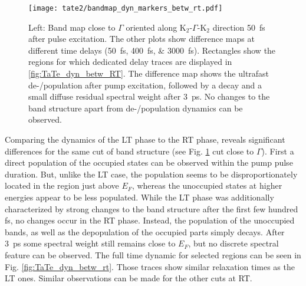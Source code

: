 \begin{figure}[t!]
	\centering
	\texttt{[image: tate2/bandmap\_dyn\_markers\_betw\_rt.pdf]}
	\caption{Left: Band map close to $\Gamma$ oriented along K$_2$-$\Gamma$-K$_2$ direction \qty{50}{\femto\second} after pulse excitation. The other plots show difference maps at different time delays (\qtylist{50;400;3000}{\femto\second}). Rectangles show the regions for which dedicated delay traces are displayed in \ref{fig:TaTe_dyn_betw_RT}. The difference map shows the ultrafast de-/population after pump excitation, followed by a decay and a small diffuse residual spectral weight after \qty{3}{\pico\second}. No changes to the band structure apart from de-/population dynamics can be observed.}
	\label{fig:TaTe_bandmap_dyn_betw_rt}
\end{figure}

Comparing the dynamics of the LT phase to the RT phase, reveals significant differences for the same cut of band structure (see Fig. \ref{fig:TaTe_bandmap_dyn_betw_rt} cut close to $\Gamma$).
First a direct population of the occupied states can be observed within the pump pulse duration.
But, unlike the LT case, the population seems to be disproportionately located in the region just above $E_F$, whereas the unoccupied states at higher energies appear to be less populated.
While the LT phase was additionally characterized by strong changes to the band structure after the first few hundred \unit{\femto\second}, no changes occur in the RT phase.
Instead, the population of the unoccupied bands, as well as the depopulation of the occupied parts simply decays.
After \qty{3}{\pico\second} some spectral weight still remains close to $E_F$, but no discrete spectral feature can be observed.
The full time dynamic for selected regions can be seen in Fig. \ref{fig:TaTe_dyn_betw_rt}.
Those traces show similar relaxation times as the LT ones.
Similar observations can be made for the other cuts at RT.

